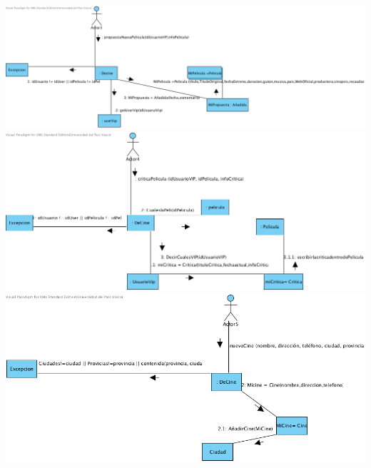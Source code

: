 \documentclass{article}
\begin{document}
\begin{center}
\includegraphics[width=1.3\linewidth]{./J-3}
\includegraphics[width=1.3\linewidth]{./J-4}
\includegraphics[width=1.3\linewidth]{./J-5}
\end{center}
\end{document}
